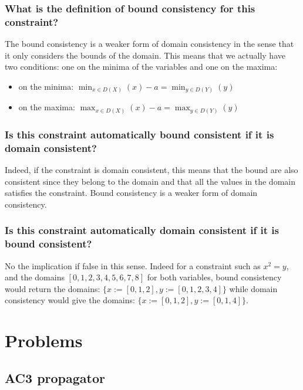 \documentclass[a4paper ,12pt,french]{article}
\begin{document}
\subsubsection{What is the definition of bound consistency for this constraint?}
The bound consistency is a weaker form of domain consistency in the sense that it only considers the bounds of the domain. This means that we actually have two conditions: one on the minima of the variables and one on the maxima: \begin{itemize}
\item on the minima: $\min_{x\in D(X)}(x) - a = \min_{y\in D(Y)}(y)$
\item on the maxima: $\max_{x\in D(X)}(x) - a = \max_{y\in D(Y)}(y)$
\end{itemize}
\subsubsection{Is this constraint automatically bound consistent if it is domain consistent?}
Indeed, if the constraint is domain consistent, this means that the bound are also consistent since they belong to the domain and that all the values in the domain satisfies the constraint. Bound consistency is a weaker form of domain consistency. 

\subsubsection{Is this constraint automatically domain consistent if it is bound consistent?}
No the implication if false in this sense. Indeed for a constraint such as $x^2 = y$, and the domains $[0, 1, 2, 3, 4, 5, 6, 7, 8]$ for both variables, bound consistency would return the domains: $\{x := [0, 1, 2], y := [0, 1, 2, 3, 4] \}$ while domain consistency would give the domains: $\{x := [0, 1, 2], y := [0, 1, 4] \}$.
\section{Problems}
\subsection{AC3 propagator}
\end{document}
